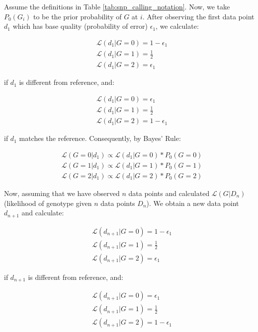Assume the definitions in Table \ref{tab:snp_calling_notation}. Now, we take $P_0(G_i)$ to be the prior probability of $G$ at $i$. After observing the first data point $d_1$ which has base quality (probability of error) $\epsilon_1$, we calculate:

\begin{align*}
&\mathcal{L}(d_1|G=0) = 1 - \epsilon_1\\
&\mathcal{L}(d_1|G=1) = \frac{1}{2}\\
&\mathcal{L}(d_1|G=2) = \epsilon_1
\end{align*}

if $d_1$ is different from reference, and:

\begin{align*}
&\mathcal{L}(d_1|G=0) = \epsilon_1\\
&\mathcal{L}(d_1|G=1) = \frac{1}{2}\\
&\mathcal{L}(d_1|G=2) = 1 - \epsilon_1
\end{align*}

if $d_1$ matches the reference. Consequently, by Bayes' Rule:

\begin{align*}
&\mathcal{L}(G=0|d_1) \propto \mathcal{L}(d_1|G=0) * P_0(G=0)\\
&\mathcal{L}(G=1|d_1) \propto \mathcal{L}(d_1|G=1) * P_0(G=1)\\
&\mathcal{L}(G=2|d_1) \propto \mathcal{L}(d_1|G=2) *  P_0(G=2)
\end{align*}

Now, assuming that we have observed $n$ data points and calculated $\mathcal{L}(G|D_n)$ (likelihood of genotype given $n$ data points $D_n$). We obtain a new data point $d_{n+1}$ and calculate:

\begin{align*}
&\mathcal{L}(d_{n+1}|G=0) = 1 - \epsilon_1\\
&\mathcal{L}(d_{n+1}|G=1) = \frac{1}{2}\\
&\mathcal{L}(d_{n+1}|G=2) = \epsilon_1
\end{align*}

if $d_{n+1}$ is different from reference, and:

\begin{align*}
&\mathcal{L}(d_{n+1}|G=0) = \epsilon_1\\
&\mathcal{L}(d_{n+1}|G=1) = \frac{1}{2}\\
&\mathcal{L}(d_{n+1}|G=2) = 1 - \epsilon_1
\end{align*}

